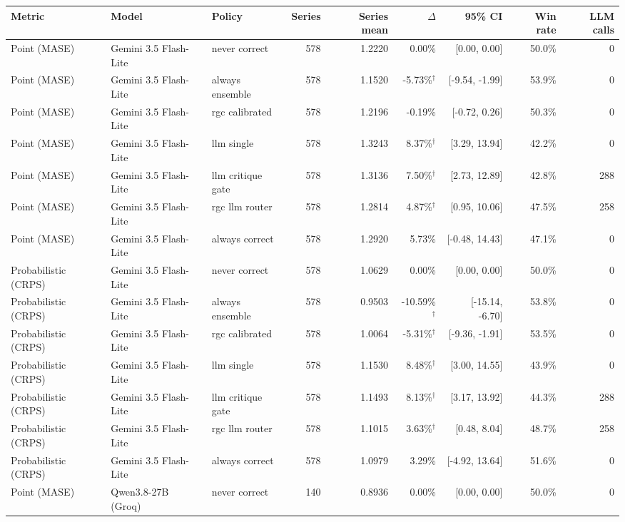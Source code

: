 \begin{tabular}{lllrrrrrr}
\toprule
Metric & Model & Policy & Series & Series mean & $\Delta$ & 95\% CI & Win rate & LLM calls \\
\midrule
Point (MASE) & Gemini 3.5 Flash-Lite & never correct & 578 & 1.2220 & 0.00\% & [0.00, 0.00] & 50.0\% & 0 \\
Point (MASE) & Gemini 3.5 Flash-Lite & always ensemble & 578 & 1.1520 & -5.73\%$^\dagger$ & [-9.54, -1.99] & 53.9\% & 0 \\
Point (MASE) & Gemini 3.5 Flash-Lite & rgc calibrated & 578 & 1.2196 & -0.19\% & [-0.72, 0.26] & 50.3\% & 0 \\
Point (MASE) & Gemini 3.5 Flash-Lite & llm single & 578 & 1.3243 & 8.37\%$^\dagger$ & [3.29, 13.94] & 42.2\% & 0 \\
Point (MASE) & Gemini 3.5 Flash-Lite & llm critique gate & 578 & 1.3136 & 7.50\%$^\dagger$ & [2.73, 12.89] & 42.8\% & 288 \\
Point (MASE) & Gemini 3.5 Flash-Lite & rgc llm router & 578 & 1.2814 & 4.87\%$^\dagger$ & [0.95, 10.06] & 47.5\% & 258 \\
Point (MASE) & Gemini 3.5 Flash-Lite & always correct & 578 & 1.2920 & 5.73\% & [-0.48, 14.43] & 47.1\% & 0 \\
Probabilistic (CRPS) & Gemini 3.5 Flash-Lite & never correct & 578 & 1.0629 & 0.00\% & [0.00, 0.00] & 50.0\% & 0 \\
Probabilistic (CRPS) & Gemini 3.5 Flash-Lite & always ensemble & 578 & 0.9503 & -10.59\%$^\dagger$ & [-15.14, -6.70] & 53.8\% & 0 \\
Probabilistic (CRPS) & Gemini 3.5 Flash-Lite & rgc calibrated & 578 & 1.0064 & -5.31\%$^\dagger$ & [-9.36, -1.91] & 53.5\% & 0 \\
Probabilistic (CRPS) & Gemini 3.5 Flash-Lite & llm single & 578 & 1.1530 & 8.48\%$^\dagger$ & [3.00, 14.55] & 43.9\% & 0 \\
Probabilistic (CRPS) & Gemini 3.5 Flash-Lite & llm critique gate & 578 & 1.1493 & 8.13\%$^\dagger$ & [3.17, 13.92] & 44.3\% & 288 \\
Probabilistic (CRPS) & Gemini 3.5 Flash-Lite & rgc llm router & 578 & 1.1015 & 3.63\%$^\dagger$ & [0.48, 8.04] & 48.7\% & 258 \\
Probabilistic (CRPS) & Gemini 3.5 Flash-Lite & always correct & 578 & 1.0979 & 3.29\% & [-4.92, 13.64] & 51.6\% & 0 \\
Point (MASE) & Qwen3.8-27B (Groq) & never correct & 140 & 0.8936 & 0.00\% & [0.00, 0.00] & 50.0\% & 0 \\

\end{tabular}
